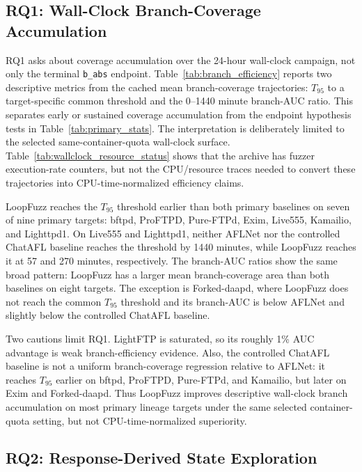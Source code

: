 \documentclass[final,5p,times,number]{elsarticle}
\begin{document}
\subsection{RQ1: Wall-Clock Branch-Coverage Accumulation}
RQ1 asks about coverage accumulation over the 24-hour wall-clock campaign, not only the terminal \texttt{b\_abs} endpoint. Table~\ref{tab:branch_efficiency} reports two descriptive metrics from the cached mean branch-coverage trajectories: $T_{95}$ to a target-specific common threshold and the 0--1440 minute branch-AUC ratio. This separates early or sustained coverage accumulation from the endpoint hypothesis tests in Table~\ref{tab:primary_stats}. The interpretation is deliberately limited to the selected same-container-quota wall-clock surface. Table~\ref{tab:wallclock_resource_status} shows that the archive has fuzzer execution-rate counters, but not the CPU/resource traces needed to convert these trajectories into CPU-time-normalized efficiency claims.

LoopFuzz reaches the $T_{95}$ threshold earlier than both primary baselines on seven of nine primary targets: bftpd, ProFTPD, Pure-FTPd, Exim, Live555, Kamailio, and Lighttpd1. On Live555 and Lighttpd1, neither AFLNet nor the controlled ChatAFL baseline reaches the threshold by 1440 minutes, while LoopFuzz reaches it at 57 and 270 minutes, respectively. The branch-AUC ratios show the same broad pattern: LoopFuzz has a larger mean branch-coverage area than both baselines on eight targets. The exception is Forked-daapd, where LoopFuzz does not reach the common $T_{95}$ threshold and its branch-AUC is below AFLNet and slightly below the controlled ChatAFL baseline.

Two cautions limit RQ1. LightFTP is saturated, so its roughly 1\% AUC advantage is weak branch-efficiency evidence. Also, the controlled ChatAFL baseline is not a uniform branch-coverage regression relative to AFLNet: it reaches $T_{95}$ earlier on bftpd, ProFTPD, Pure-FTPd, and Kamailio, but later on Exim and Forked-daapd. Thus LoopFuzz improves descriptive wall-clock branch accumulation on most primary lineage targets under the same selected container-quota setting, but not CPU-time-normalized superiority.

\subsection{RQ2: Response-Derived State Exploration}
\end{document}
